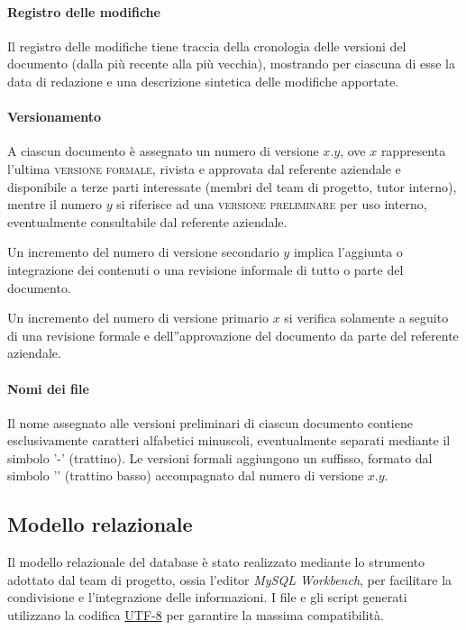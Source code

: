 \paragraph{Registro delle modifiche}
Il registro delle modifiche tiene traccia della cronologia delle versioni del documento (dalla più recente alla più vecchia), mostrando per ciascuna di esse la data di redazione e una descrizione sintetica delle modifiche apportate.

\paragraph{Versionamento}
A ciascun documento è assegnato un numero di versione $x.y$, ove $x$ rappresenta l'ultima \textsc{versione formale}, rivista e approvata dal referente aziendale e disponibile a terze parti interessate (membri del team di progetto, tutor interno), mentre il numero $y$ si riferisce ad una \textsc{versione preliminare} per uso interno, eventualmente consultabile dal referente aziendale.

Un incremento del numero di versione secondario $y$ implica l'aggiunta o integrazione dei contenuti o una revisione informale di tutto o parte del documento.

Un incremento del numero di versione primario $x$ si verifica solamente a seguito di una revisione formale e dell''approvazione del documento da parte del referente aziendale.

\paragraph{Nomi dei file}
Il nome assegnato alle versioni preliminari di ciascun documento contiene esclusivamente caratteri alfabetici minuscoli, eventualmente separati mediante il simbolo '-' (trattino). Le versioni formali aggiungono un suffisso, formato dal simbolo '\textunderscore' (trattino basso) accompagnato dal numero di versione $x.y$.

\subsection{Modello relazionale}
Il modello relazionale del database è stato realizzato mediante lo strumento adottato dal team di progetto, ossia l'editor \textit{MySQL Workbench}, per facilitare la condivisione e l'integrazione delle informazioni. I file e gli script generati utilizzano la codifica \underline{UTF-8} per garantire la massima compatibilità.

